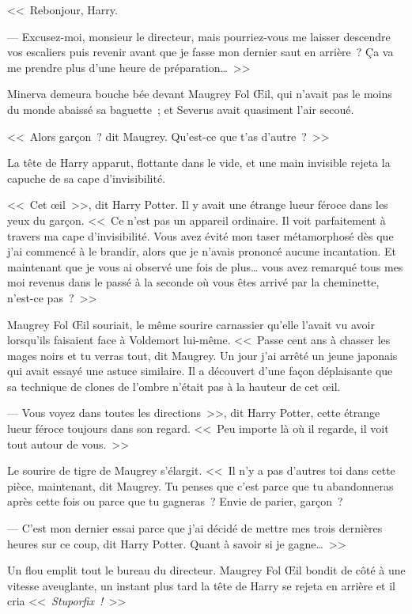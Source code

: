 \later

<<~Rebonjour, Harry.

--- Excusez-moi, monsieur le directeur, mais pourriez-vous me laisser descendre vos escaliers puis revenir avant que je fasse mon dernier saut en arrière~? Ça va me prendre plus d'une heure de préparation…~>>

\later

Minerva demeura bouche bée devant Maugrey Fol Œil, qui n'avait pas le moins du monde abaissé sa baguette~; et Severus avait quasiment l'air secoué.

<<~Alors garçon~? dit Maugrey. Qu'est-ce que t'as d'autre~?~>>

La tête de Harry apparut, flottante dans le vide, et une main invisible rejeta la capuche de sa cape d'invisibilité.

<<~Cet œil~>>, dit Harry Potter. Il y avait une étrange lueur féroce dans les yeux du garçon. <<~Ce n'est pas un appareil ordinaire. Il voit parfaitement à travers ma cape d'invisibilité. Vous avez évité mon taser métamorphosé dès que j'ai commencé à le brandir, alors que je n'avais prononcé aucune incantation. Et maintenant que je vous ai observé une fois de plus… vous avez remarqué tous mes moi revenus dans le passé à la seconde où vous êtes arrivé par la cheminette, n'est-ce pas~?~>>

Maugrey Fol Œil souriait, le même sourire carnassier qu'elle l'avait vu avoir lorsqu'ils faisaient face à Voldemort lui-même. <<~Passe cent ans à chasser les mages noirs et tu verras tout, dit Maugrey. Un jour j'ai arrêté un jeune japonais qui avait essayé une astuce similaire. Il a découvert d'une façon déplaisante que sa technique de clones de l'ombre n'était pas à la hauteur de cet œil.

--- Vous voyez dans toutes les directions~>>, dit Harry Potter, cette étrange lueur féroce toujours dans son regard. <<~Peu importe là où il regarde, il voit tout autour de vous.~>>

Le sourire de tigre de Maugrey s'élargit. <<~Il n'y a pas d'autres toi dans cette pièce, maintenant, dit Maugrey. Tu penses que c'est parce que tu abandonneras après cette fois ou parce que tu gagneras~? Envie de parier, garçon~?

--- C'est mon dernier essai parce que j'ai décidé de mettre mes trois dernières heures sur ce coup, dit Harry Potter. Quant à savoir si je gagne…~>>

Un flou emplit tout le bureau du directeur. Maugrey Fol Œil bondit de côté à une vitesse aveuglante, un instant plus tard la tête de Harry se rejeta en arrière et il cria <<~\emph{Stuporfix~!}~>>

